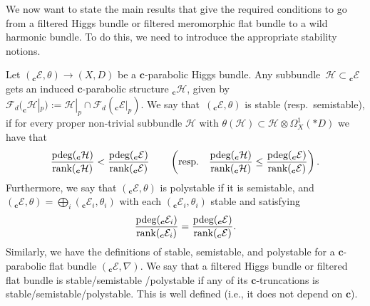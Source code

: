 We now want to state the main results that give the required conditions to go from a filtered Higgs bundle or filtered meromorphic flat bundle to a wild harmonic bundle. To do this, we need to introduce the appropriate stability notions.

\begin{Definition} Let $(_{\boldsymbol{c}}\mathcal{E},\theta)\to (X,D)$ be a $\boldsymbol{c}$-parabolic Higgs bundle. Any subbundle~${\mathcal{H}\subset {_{\boldsymbol{c}}\mathcal{E}}}$ gets an induced $\boldsymbol{c}$-parabolic structure $_{\boldsymbol{c}}\mathcal{H}$, given by $\mathcal{F}_d(_{\boldsymbol{c}}\mathcal{H}|_p):=\mathcal{H}|_p\cap \mathcal{F}_d(_{\boldsymbol{c}}\mathcal{E}|_p)$. We say that~$(_{\boldsymbol{c}}\mathcal{E},\theta)$ is stable (resp.\ semistable), if for every proper non-trivial subbundle $\mathcal{H}$ with $\theta(\mathcal{H})\subset \mathcal{H}\otimes \Omega^1_X(*D)$ we have that
\begin{equation*}
 \frac{\textnormal{pdeg}(_{\boldsymbol{c}}\mathcal{H})}{\textnormal{rank}(_{\boldsymbol{c}}\mathcal{H})}<\frac{\textnormal{pdeg}(_{\boldsymbol{c}}\mathcal{E})}{\textnormal{rank}(_{\boldsymbol{c}}\mathcal{E})} \qquad \left(\textnormal{resp.} \quad \frac{\textnormal{pdeg}(_{\boldsymbol{c}}\mathcal{H})}{\textnormal{rank}(_{\boldsymbol{c}}\mathcal{H})}\leq\frac{\textnormal{pdeg}
 (_{\boldsymbol{c}}\mathcal{E})}{\textnormal{rank}(_{\boldsymbol{c}}\mathcal{E})}\right) .
\end{equation*}
Furthermore, we say that $(_{\boldsymbol{c}}\mathcal{E},\theta)$ is polystable if it is semistable, and $(_{\boldsymbol{c}}\mathcal{E},\theta)=\bigoplus_{i}(_{\boldsymbol{c}}\mathcal{E}_i,\theta_i)$ with each $(_{\boldsymbol{c}}\mathcal{E}_i,\theta_i)$ stable and satisfying
\begin{equation*}
 \frac{\textnormal{pdeg}(_{\boldsymbol{c}}\mathcal{E}_i)}{\textnormal{rank}(_{\boldsymbol{c}}\mathcal{E}_i)}=\frac{\textnormal{pdeg}(_{\boldsymbol{c}}\mathcal{E})}{\textnormal{rank}(_{\boldsymbol{c}}\mathcal{E})}.
\end{equation*}
Similarly, we have the definitions of stable, semistable, and polystable for a $\boldsymbol{c}$-parabolic flat bundle $(_{\boldsymbol{c}}\mathcal{E},\nabla)$. We say that a filtered Higgs bundle or filtered flat bundle is stable/semistable /polystable if any of its $\boldsymbol{c}$-truncations is stable/semistable/polystable. This is well defined (i.e., it does not depend on $\boldsymbol{c}$).
\end{Definition}


